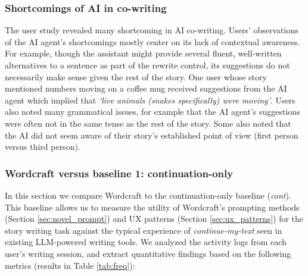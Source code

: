 \subsubsection{Shortcomings of AI in co-writing}

The user study revealed many shortcoming in AI co-writing.
Users' observations of the AI agent's shortcomings mostly center on its lack of contextual awareness. 
For example, though the assistant might provide several fluent, well-written alternatives to a sentence as part of the rewrite control, its suggestions do not necessarily make sense given the rest of the story. One user whose story mentioned numbers moving on a coffee mug received suggestions from the AI agent which implied that \textit{`live animals (snakes specifically) were moving'}.
Users also noted many grammatical issues, for example that the AI agent's suggestions were often not in the same tense as the rest of the story. Some also noted that the AI did not seem aware of their story's established point of view (first person versus third person). 




\subsubsection{Wordcraft versus baseline 1: continuation-only}
In this section we compare Wordcraft to the continuation-only baseline (\textit{cont}). 
This baseline allows us to measure the utility of Wordcraft's prompting methods (Section \ref{sec:novel_prompt}) and UX patterns (Section \ref{sec:ux_patterns}) for the story writing task against the typical experience of \textit{continue-my-text} seen in existing LLM-powered writing tools.
We analyzed the activity logs from each user's writing session, and extract quantitative findings based on the following metrics (results in Table \ref{tab:freq}):

